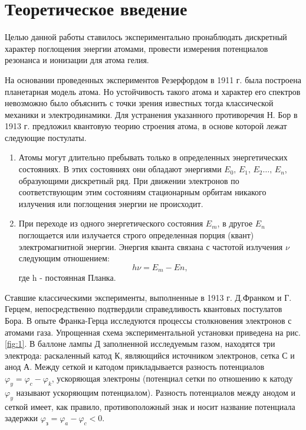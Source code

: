 



\def\labauthors{Понур К.А., Сарафанов Ф.Г., Сидоров Д.А.}
\def\labgroup{430}
\def\labnumber{5}
\def\labtheme{Опыт Франка-Герца}
\renewcommand{\phi}{\varphi}

\tableofcontents
\section{Теоретическое введение}
Целью данной работы ставилось экспериментально пронаблюдать дискретный характер поглощения энергии атомами, провести измерения потенциалов резонанса и ионизации для атома гелия.

На основании проведенных экспериментов Резерфордом в 1911 г. была построена планетарная модель атома. Но устойчивость такого атома и характер его спектров невозможно было объяснить с точки зрения известных тогда классической механики и электродинамики. Для устранения указанного противоречия Н. Бор в 1913 г. предложил квантовую теорию строения атома, в основе которой лежат следующие постулаты.

\begin{enumerate}
    \item Атомы могут длительно пребывать только в определенных энергетических состояниях. В этих состояниях они обладают энергиями $E_0,\,E_1,\,E_2\dots,\,E_n$, образующими дискретный ряд. При движении электронов по соответствующим этим состояниям стационарным орбитам никакого излучения или поглощения энергии не происходит.
    \item При переходе из одного энергетического состояния $E_m$, в другое $E_n$ поглощается или излучается строго определенная порция (квант) электромагнитной энергии. Энергия кванта связана с частотой излучения $\nu$ следующим отношением: $$h\nu=E_m-En, $$ где h - постоянная Планка.
\end{enumerate}	

Ставшие классическими эксперименты, выполненные в 1913 г. Д.Франком и Г. Герцем, непосредственно подтвердили справедливость квантовых постулатов Бора. В опыте Франка-Герца исследуются процессы столкновения электронов с атомами газа. Упрощенная схема экспериментальной установки приведена на рис.\ref{fig:1}. В баллоне лампы Д заполненной исследуемым газом, находятся три электрода: раскаленный катод К, являющийся источником электронов, сетка С и анод А. Между сеткой и катодом прикладывается разность потенциалов $\phi_{y} =\phi_{c} -\phi_{k}$, ускоряющая электроны (потенциал сетки по отношению к катоду $\phi_y$ называют ускоряющим потенциалом). Разность потенциалов между анодом и сеткой имеет, как правило, противоположный знак и носит название потенциала задержки $\phi_{\text{з}} =\phi_{a} -\phi_{c}<0$.

